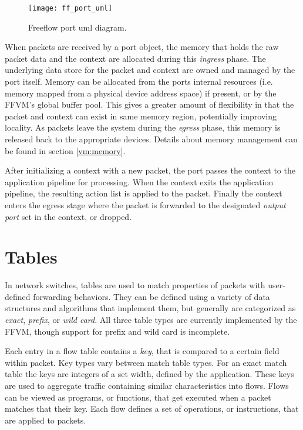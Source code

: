 \begin{figure}[h]
\centering
\texttt{[image: ff\_port\_uml]}
\caption{Freeflow port uml diagram.}
\label{port_uml}
\end{figure}

When packets are received by a port object, the memory that holds the raw
packet data and the context are allocated during this \emph{ingress} phase. The
underlying data store for the packet and context are owned and managed by the
port itself. Memory can be allocated from the ports internal resources (i.e.
memory mapped from a physical device address space) if present, or by the FFVM's
global buffer pool. This gives a greater amount of flexibility in that the
packet and context can exist in same memory region, potentially improving
locality. As packets leave the system during the \emph{egress} phase, this
memory is released back to the appropriate devices. Details about memory
management can be found in section \ref{vm:memory}.

After initializing a context with a new packet, the port passes the context to
the application pipeline for processing. When the context exits the application
pipeline, the resulting action list is applied to the packet. Finally the
context enters the egress stage where the packet is forwarded to the designated
\emph{output port} set in the context, or dropped.

\section{Tables}
\label{vm:tables}
In network switches, tables are used to match properties of packets
with user-defined forwarding behaviors. They can be defined using a variety of
data structures and algorithms that implement them, but generally are categorized
as \emph{exact}, \emph{prefix}, or \emph{wild card}. All three table types are
currently implemented by the FFVM, though support for prefix and wild card is
incomplete.

Each entry in a flow table contains a \emph{key}, that is compared to a
certain field within packet. Key types vary between match table types. For an
exact match table the keys are integers of a set width, defined by the
application. These keys are used to aggregate traffic containing similar
characteristics into flows. Flows can be viewed as programs, or functions,
that get executed when a packet matches that their key. Each flow defines a
set of operations, or instructions, that are applied to packets.

